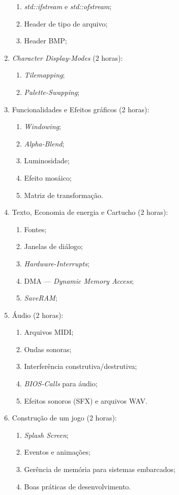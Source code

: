 \documentclass{article}
\begin{document}
\begin{enumerate}
\begin{enumerate}
            \item \textit{std::ifstream} e \textit{std::ofstream};
            \item Header de tipo de arquivo;
            \item Header BMP\@;
        \end{enumerate}
    \item \textit{Character Display-Modes} (2 horas):
        \begin{enumerate}
            \item \textit{Tilemapping};
            \item \textit{Palette-Swapping};
        \end{enumerate}
    \item Funcionalidades e Efeitos gráficos (2 horas):
        \begin{enumerate}
            \item \textit{Windowing};
            \item \textit{Alpha-Blend};
            \item Luminosidade;
            \item Efeito mosáico;
            \item Matriz de transformação.
        \end{enumerate}
    \item Texto, Economia de energia e Cartucho (2 horas):
        \begin{enumerate}
            \item Fontes;
            \item Janelas de diálogo;
            \item \textit{Hardware-Interrupts};
            \item DMA --- \textit{Dynamic Memory Access};
            \item \textit{SaveRAM};
        \end{enumerate}
    \item Áudio (2 horas):
        \begin{enumerate}
            \item Arquivos MIDI\@;
            \item Ondas sonoras;
            \item Interferência construtiva/destrutiva;
            \item \textit{BIOS-Calls} para áudio;
            \item Efeitos sonoros (SFX) e arquivos WAV\@.
        \end{enumerate}
    \item Construção de um jogo (2 horas):
        \begin{enumerate}
            \item \textit{Splash Screen};
            \item Eventos e animações;
            \item Gerência de memória para sistemas embarcados;
            \item Boas práticas de desenvolvimento.
        \end{enumerate}
\end{enumerate}
\end{document}
